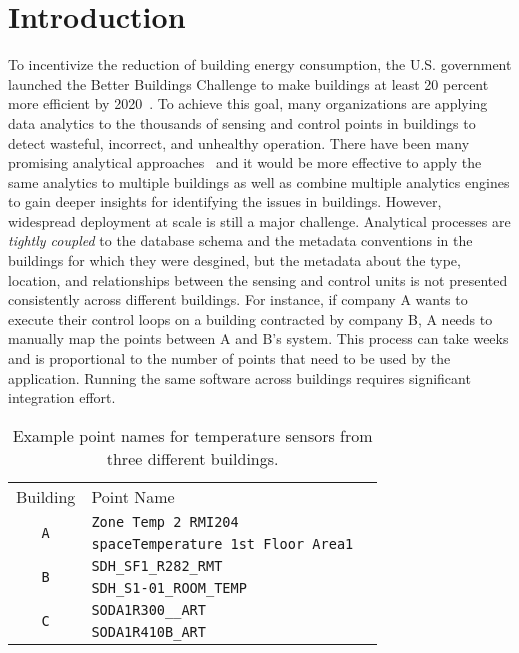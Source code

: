 \section{Introduction}

To incentivize the reduction of building energy consumption, the U.S. government 
launched the Better Buildings Challenge to make buildings at least 20 percent 
more efficient by 2020~\cite{doe2013better}. To achieve this goal, many organizations 
are applying data analytics to the thousands of sensing and control points in 
buildings to detect wasteful, incorrect, and unhealthy operation.  
There have been many promising analytical approaches~\cite{} and it would be more effective to apply
the same analytics to multiple buildings as well as combine multiple analytics engines to
gain deeper insights for identifying the issues in buildings.
However, widespread deployment at scale is still a major challenge.
Analytical processes are \emph{tightly coupled} to the database schema and the metadata conventions in the buildings for which they were desgined, but the metadata about the type, location, and relationships between the sensing 
and control units is not presented consistently across different buildings.
For instance, if company A wants to execute their 
control loops on a building contracted by company B, A needs to manually 
map the points between A and B's system. This process can take weeks and is proportional 
to the number of points that need to be used by the application. 
Running the same software across buildings requires significant integration effort.


\begin{table}[h]
\centering
\begin{tabular}{c|ll}
\cline{1-2}
Building & Point Name & \\
\cline{1-2}
\multirow{2}{*}{\texttt{A}}  & \texttt{Zone Temp 2 RMI204} &  \\
					& \texttt{spaceTemperature 1st Floor Area1} &  \\ \cline{1-2}
\multirow{2}{*}{\texttt{B}} & \texttt{SDH\_SF1\_R282\_RMT} &  \\
                     & \texttt{SDH\_S1-01\_ROOM\_TEMP} &  \\ \cline{1-2}
\multirow{2}{*}{\texttt{C}}  & \texttt{SODA1R300\_\_ART} &  \\
					  & \texttt{SODA1R410B\_ART} &  \\ \cline{1-2}
\end{tabular}
\caption{Example point names for temperature sensors from three different buildings.}
\label{table:ex}
\end{table}


